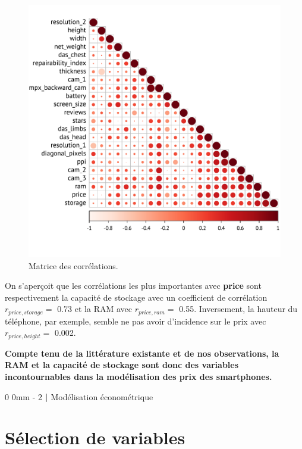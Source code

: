 \documentclass[
  12pt,
]{report}
\makeatletter
\renewcommand{\chapter}{%
    \clearpage %
    \@startsection{chapter}%
    {0} %
    {0mm} %
    {-\baselineskip} %
    {2\baselineskip} %
    {\normalfont\Huge\bfseries | \Huge\bfseries}%
}
\makeatother
\begin{document}
\begin{figure}[H]

{\centering \includegraphics{report_files/figure-pdf/correlation-1.pdf}

}

\caption{Matrice des corrélations.}

\end{figure}%

On s'aperçoit que les corrélations les plus importantes avec
\textbf{price} sont respectivement la capacité de stockage avec un
coefficient de corrélation \(r_{price, storage}=\) 0.73 et la RAM avec
\(r_{price, ram}=\) 0.55. Inversement, la hauteur du téléphone, par
exemple, semble ne pas avoir d'incidence sur le prix avec
\(r_{price, height}=\) 0.002.

\textbf{Compte tenu de la littérature existante et de nos observations,
la RAM et la capacité de stockage sont donc des variables
incontournables dans la modélisation des prix des smartphones.}

\chapter{Modélisation
économétrique}\label{moduxe9lisation-uxe9conomuxe9trique}

\section{Sélection de variables}\label{suxe9lection-de-variables}
\end{document}
